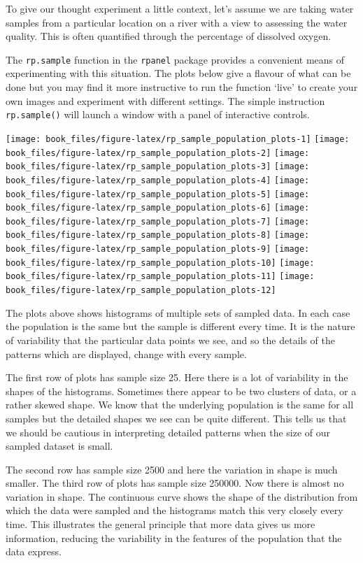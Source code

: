 \documentclass[
]{book}
\begin{document}
To give our thought experiment a little context, let's assume we are taking water samples from a particular location on a river with a view to assessing the water quality. This is often quantified through the percentage of dissolved oxygen.

The \texttt{rp.sample} function in the \texttt{rpanel} package provides a convenient means of experimenting with this situation. The plots below give a flavour of what can be done but you may find it more instructive to run the function `live' to create your own images and experiment with different settings. The simple instruction \texttt{rp.sample()} will launch a window with a panel of interactive controls.

\texttt{[image: book\_files/figure-latex/rp\_sample\_population\_plots-1]} \texttt{[image: book\_files/figure-latex/rp\_sample\_population\_plots-2]} \texttt{[image: book\_files/figure-latex/rp\_sample\_population\_plots-3]} \texttt{[image: book\_files/figure-latex/rp\_sample\_population\_plots-4]} \texttt{[image: book\_files/figure-latex/rp\_sample\_population\_plots-5]} \texttt{[image: book\_files/figure-latex/rp\_sample\_population\_plots-6]} \texttt{[image: book\_files/figure-latex/rp\_sample\_population\_plots-7]} \texttt{[image: book\_files/figure-latex/rp\_sample\_population\_plots-8]} \texttt{[image: book\_files/figure-latex/rp\_sample\_population\_plots-9]} \texttt{[image: book\_files/figure-latex/rp\_sample\_population\_plots-10]} \texttt{[image: book\_files/figure-latex/rp\_sample\_population\_plots-11]} \texttt{[image: book\_files/figure-latex/rp\_sample\_population\_plots-12]}

The plots above shows histograms of multiple sets of sampled data. In each case the population is the same but the sample is different every time. It is the nature of variability that the particular data points we see, and so the details of the patterns which are displayed, change with every sample.

The first row of plots has sample size 25. Here there is a lot of variability in the shapes of the histograms. Sometimes there appear to be two clusters of data, or a rather skewed shape. We know that the underlying population is the same for all samples but the detailed shapes we see can be quite different. This tells us that we should be cautious in interpreting detailed patterns when the size of our sampled dataset is small.

The second row has sample size 2500 and here the variation in shape is much smaller. The third row of plots has sample size 250000. Now there is almost no variation in shape. The continuous curve shows the shape of the distribution from which the data were sampled and the histograms match this very closely every time. This illustrates the general principle that more data gives us more information, reducing the variability in the features of the population that the data express.
\end{document}
